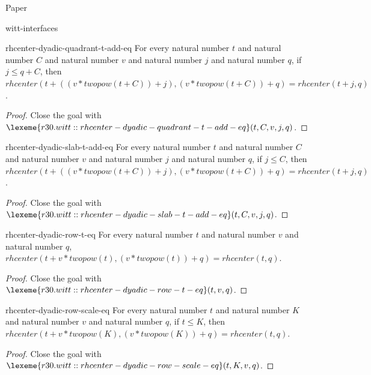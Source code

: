 \begin{lexlean}{Paper}
\begin{section}{witt-interfaces}
  \begin{theorem}{rhcenter-dyadic-quadrant-t-add-eq}
  For every natural number \(t\) and natural number \(C\) and natural number \(v\) and natural number \(j\) and natural number \(q\), if \(j ≤ q + C\), then \(rhcenter(t + ((v * twopow(t + C)) + j), (v * twopow(t + C)) + q) = rhcenter(t + j, q)\).
  \begin{proof}
  Close the goal with \(\lexeme{r30.witt::rhcenter-dyadic-quadrant-t-add-eq}(t, C, v, j, q)\).
  \end{proof}
  \end{theorem}

  \begin{theorem}{rhcenter-dyadic-slab-t-add-eq}
  For every natural number \(t\) and natural number \(C\) and natural number \(v\) and natural number \(j\) and natural number \(q\), if \(j ≤ C\), then \(rhcenter(t + ((v * twopow(t + C)) + j), (v * twopow(t + C)) + q) = rhcenter(t + j, q)\).
  \begin{proof}
  Close the goal with \(\lexeme{r30.witt::rhcenter-dyadic-slab-t-add-eq}(t, C, v, j, q)\).
  \end{proof}
  \end{theorem}

  \begin{theorem}{rhcenter-dyadic-row-t-eq}
  For every natural number \(t\) and natural number \(v\) and natural number \(q\), \(rhcenter(t + v * twopow(t), (v * twopow(t)) + q) = rhcenter(t, q)\).
  \begin{proof}
  Close the goal with \(\lexeme{r30.witt::rhcenter-dyadic-row-t-eq}(t, v, q)\).
  \end{proof}
  \end{theorem}

  \begin{theorem}{rhcenter-dyadic-row-scale-eq}
  For every natural number \(t\) and natural number \(K\) and natural number \(v\) and natural number \(q\), if \(t ≤ K\), then \(rhcenter(t + v * twopow(K), (v * twopow(K)) + q) = rhcenter(t, q)\).
  \begin{proof}
  Close the goal with \(\lexeme{r30.witt::rhcenter-dyadic-row-scale-eq}(t, K, v, q)\).
  \end{proof}
  \end{theorem}


\end{section}
\end{lexlean}

